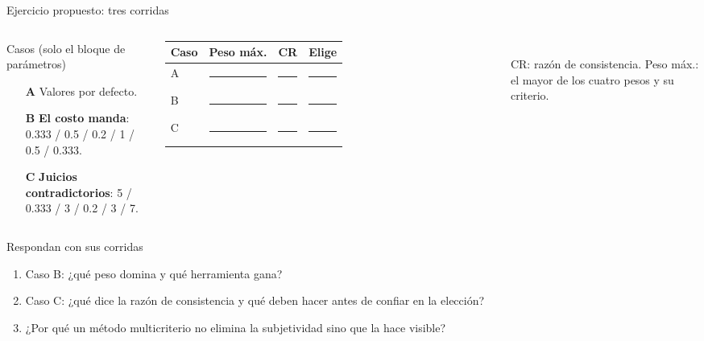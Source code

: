 \documentclass[aspectratio=169,xcolor=dvipsnames]{beamer}
\begin{document}
\begin{frame}{Ejercicio propuesto: tres corridas}
\begin{columns}[T]
  \begin{exampleblock}{Casos (solo el bloque de parámetros)}
    \scriptsize
    \begin{itemize}
      \item[\textbf{A}] Valores por defecto.
      \item[\textbf{B}] \textbf{El costo manda}: 0.333 / 0.5 / 0.2 / 1 / 0.5 / 0.333.
      \item[\textbf{C}] \textbf{Juicios contradictorios}: 5 / 0.333 / 3 / 0.2 / 3 / 7.
    \end{itemize}
  \end{exampleblock}
  \scriptsize
  \begin{tabular}{@{}lccc@{}}
    \toprule
    Caso & Peso máx. & CR & Elige \\
    \midrule
    A & \rule{0.8cm}{0.4pt} & \rule{0.8cm}{0.4pt} & \rule{0.8cm}{0.4pt} \\[2pt]
    B & \rule{0.8cm}{0.4pt} & \rule{0.8cm}{0.4pt} & \rule{0.8cm}{0.4pt} \\[2pt]
    C & \rule{0.8cm}{0.4pt} & \rule{0.8cm}{0.4pt} & \rule{0.8cm}{0.4pt} \\
    \bottomrule
  \end{tabular}\\[2pt]
  {\tiny CR: razón de consistencia. Peso máx.: el mayor de los cuatro pesos y su criterio.}
\end{columns}
\vspace{2pt}
\begin{block}{Respondan con sus corridas}
  \scriptsize
  \begin{enumerate}
    \item Caso B: ¿qué peso domina y qué herramienta gana?
    \item Caso C: ¿qué dice la razón de consistencia y qué deben hacer antes de confiar en la elección?
    \item ¿Por qué un método multicriterio no elimina la subjetividad sino que la hace visible?
  \end{enumerate}
\end{block}
\end{frame}
\end{document}
